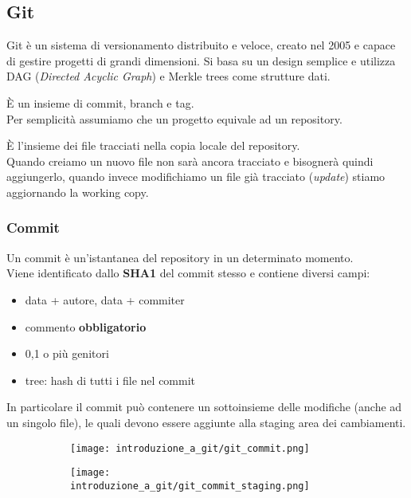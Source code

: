 \documentclass[12pt]{article}
\begin{document}
\subsection{Git}
Git è un sistema di versionamento distribuito e veloce, creato nel 2005 e capace di gestire progetti di grandi dimensioni.
Si basa su un design semplice e utilizza DAG (\textit{Directed Acyclic Graph}) e Merkle trees come strutture dati.
\begin{definition}[Repository]
È un insieme di commit, branch e tag.\\
Per semplicità assumiamo che un progetto equivale ad un repository.
\end{definition}
\begin{definition}
È l'insieme dei file tracciati nella copia locale del repository.\\
Quando creiamo un nuovo file non sarà ancora tracciato e bisognerà quindi aggiungerlo, quando invece modifichiamo un file già tracciato (\textit{update}) stiamo aggiornando la working copy.
\end{definition}

\subsubsection{Commit}
Un commit è un'istantanea del repository in un determinato momento.\\
Viene identificato dallo \textbf{SHA1} del commit stesso e contiene diversi campi:
\begin{itemize}
\item data + autore, data + commiter
\item commento \textbf{obbligatorio}
\item 0,1 o più genitori
\item tree: hash di tutti i file nel commit
\end{itemize}
\begin{minipage}{\textwidth}
In particolare il commit può contenere un sottoinsieme delle modifiche (anche ad un singolo file), le quali devono essere aggiunte alla staging area dei cambiamenti.
\begin{figure}[H]
\centering
\begin{subfigure}{0.49\textwidth}
\centering
\texttt{[image: introduzione\_a\_git/git\_commit.png]}
\end{subfigure}
\hfill
\begin{subfigure}{0.49\textwidth}
\centering
\texttt{[image: introduzione\_a\_git/git\_commit\_staging.png]}
\end{subfigure}
\end{figure}
\end{minipage}
\end{document}
